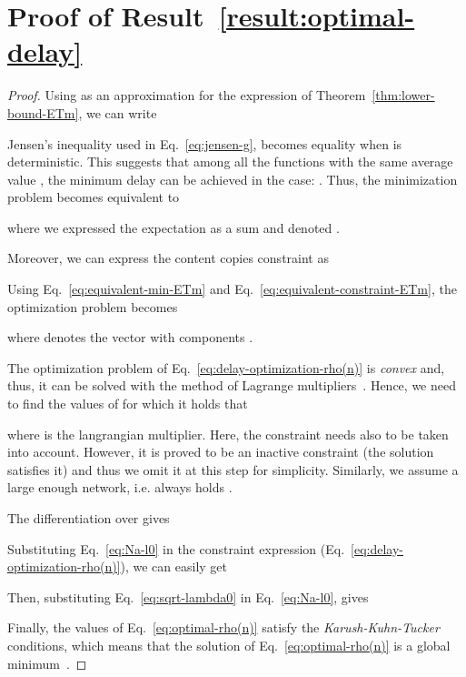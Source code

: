 \documentclass[journal]{IEEEtran}
\newcommand{\eq}[1]{Eq.~\eqref{#1}}
\begin{document}
\section{Proof of Result~\ref{result:optimal-delay}}\label{appendix:proof-result:optimal-delay}
\begin{proof}
Using as an approximation for  the expression of Theorem~\ref{thm:lower-bound-ETm}, we can write

Jensen's inequality used in \eq{eq:jensen-g}, becomes equality when  is deterministic. This suggests that among all the functions  with the same average value , the minimum delay can be achieved in the case: . Thus, the  minimization problem becomes equivalent to 

\begin{footnotesize}

\end{footnotesize}
where we expressed the expectation as a sum and denoted .

Moreover, we can express the content copies constraint as

Using \eq{eq:equivalent-min-ETm} and \eq{eq:equivalent-constraint-ETm}, the optimization problem becomes

where  denotes the vector with components . 

The optimization problem of \eq{eq:delay-optimization-rho(n)} is \textit{convex} and, thus, it can be solved with the method of Lagrange multipliers~\cite{practical-optimization-book}. Hence, we need to find the values of  for which it holds that

where  is the langrangian multiplier. Here, the constraint  needs also to be taken into account. However, it is proved to be an inactive constraint (the solution satisfies it) and thus we omit it at this step for simplicity. Similarly, we assume a large enough network, i.e. always holds .

The differentiation over  gives

Substituting \eq{eq:Na-l0} in the constraint expression  (\eq{eq:delay-optimization-rho(n)}), we can easily get

Then, substituting \eq{eq:sqrt-lambda0} in \eq{eq:Na-l0}, gives

Finally, the values of \eq{eq:optimal-rho(n)} satisfy the \textit{Karush-Kuhn-Tucker} conditions, which means that the solution of \eq{eq:optimal-rho(n)} is a global minimum~\cite{practical-optimization-book}.
\end{proof}
\end{document}
